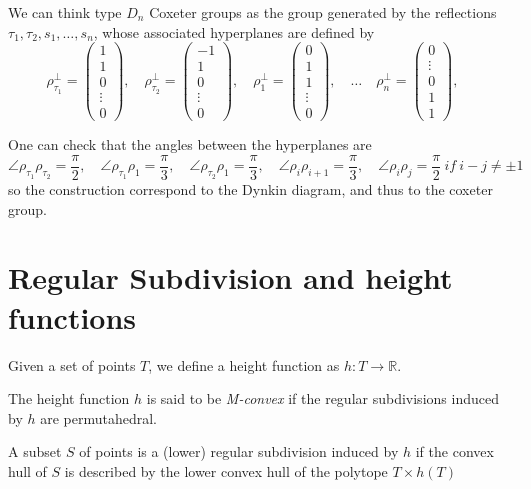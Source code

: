 \documentclass{myclass}
\begin{document}
We can think type $D_n$ Coxeter groups as the group generated by the reflections  $\tau_1, \tau_2, s_1, \ldots, s_n$, whose associated hyperplanes are defined by
\[
\rho_{\tau_1} ^\perp = \begin{pmatrix} 1 \\ 1 \\ 0 \\  \vdots \\ 0 \end{pmatrix} , \quad 
\rho_{\tau_2} ^\perp = \begin{pmatrix} -1 \\ 1 \\ 0\\ \vdots \\ 0 \end{pmatrix} , \quad 
\rho_1 ^\perp = \begin{pmatrix} 0 \\ 1 \\ 1\\ \vdots \\ 0 \end{pmatrix} , \quad \ldots \quad
\rho_n ^\perp = \begin{pmatrix} 0 \\ \vdots \\ 0 \\ 1\\ 1 \end{pmatrix} , \quad 
\] 

One can check that the angles between the hyperplanes are
\[
\angle \rho_{\tau_1} \rho _{\tau _2} = \frac{\pi}{2}, \quad
\angle \rho_{\tau_1} \rho _{1} = \frac{\pi}{3}, \quad
\angle \rho_{\tau_2} \rho _{1} = \frac{\pi}{3}, \quad
\angle \rho_i \rho _{i+1} = \frac{\pi}{3}, \quad 
\angle \rho_i \rho _{j} = \frac{\pi}{2}\ if\ i-j\neq \pm 1 \quad 
\] 
so the construction correspond to the Dynkin diagram, and thus to the coxeter group.


\section{Regular Subdivision and height functions}
Given a set of points $T$, we define a height function as  $h:T \to \mathbb{R}$.

The height function $h$ is said to be \textit{M-convex} if the regular subdivisions induced by $h$ are permutahedral.

A subset $S$ of points is a (lower) regular subdivision induced by $h$ if the convex hull of $S$ is described by the lower convex hull of the polytope $T\times h(T)$ 
\end{document}
